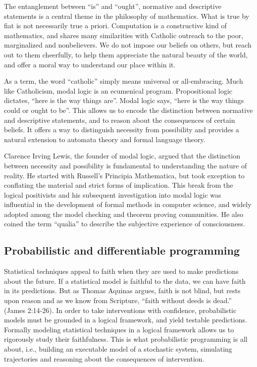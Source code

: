 \documentclass[sigplan,nonacm]{acmart}\settopmatter{printfolios=false,printccs=false,printacmref=false}
\begin{document}
  The entanglement between ``is'' and ``ought'', normative and descriptive statements is a central theme in the philosophy of mathematics. What is true by fiat is not necessarily true a priori. Computation is a constructive kind of mathematics, and shares many similarities with Catholic outreach to the poor, marginalized and nonbelievers. We do not impose our beliefs on others, but reach out to them cheerfully, to help them appreciate the natural beauty of the world, and offer a moral way to understand our place within it.

  As a term, the word ``catholic'' simply means universal or all-embracing. Much like Catholicism, modal logic is an ecumenical program. Propositional logic dictates, ``here is the way things are''. Modal logic says, ``here is the way things could or ought to be''. This allows us to encode the distinction between normative and descriptive statements, and to reason about the consequences of certain beliefs. It offers a way to distinguish necessity from possibility and provides a natural extension to automata theory and formal language theory.

  Clarence Irving Lewis, the founder of modal logic, argued that the distinction between necessity and possibility is fundamental to understanding the nature of reality. He started with Russell's Principia Mathematica, but took exception to conflating the material and strict forms of implication. This break from the logical positivists and his subsequent investigation into modal logic was influential in the development of formal methods in computer science, and widely adopted among the model checking and theorem proving communities. He also coined the term ``qualia'' to describe the subjective experience of consciousness.

  \subsection{Probabilistic and differentiable programming}

  Statistical techniques appeal to faith when they are used to make predictions about the future. If a statistical model is faithful to the data, we can have faith in its predictions. But as Thomas Aquinas argues, faith is not blind, but rests upon reason and as we know from Scripture, ``faith without deeds is dead.'' (James 2:14-26). In order to take interventions with confidence, probabilistic models must be grounded in a logical framework, and yield testable predictions. Formally modeling statistical techniques in a logical framework allows us to rigorously study their faithfulness. This is what probabilistic programming is all about, i.e., building an executable model of a stochastic system, simulating trajectories and reasoning about the consequences of intervention.
\end{document}
